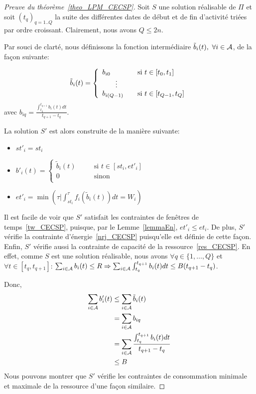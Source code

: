 \begin{proof}[Preuve du théorème~\ref{theo_LPM_CECSP}]  
  Soit $S$ une solution réalisable de $\Pi$ et soit
  $(t_q)_{q=1..Q}$ la suite des différentes dates de
  début et de fin d'activité triées par ordre croissant. Clairement,
  nous avons $Q\le 2n$. 

  Par souci de clarté, nous définissons la fonction intermédiaire
  $\tilde{b}_i(t),\ \forall i \in {\cal A}$, de la façon suivante:  

    \[\tilde{b}_i(t) =\left\{
        \begin{array}{lll}
          b_{i0} & & \text{si $t \in [t_0,t_1]$}\\
          \multicolumn{2}{c}{\vdots} &   \\
          b_{i(Q-1)} & & \text{si $t \in [t_{Q-1},t_Q]$}
        \end{array}
      \right.\]
    avec $b_{iq}=\frac{\int_{t_q}^{t_{q+1}} b_i(t) dt}{t_{q+1}-t_q}$.

    La solution $S'$ est alors construite de la manière suivante: 
    \begin{itemize}
    \item $st'_i=st_i$ 
    \item $b'_i(t)= \left\{ 
        \begin{array}{lll}
          \tilde{b}_i(t) &\quad& \text{si $t \in [st_i,et'_i]$}\\
          0 &\quad& \text{sinon}\\
        \end{array}
      \right.$
  \item $et'_i=\min(\tau | \int_{st_i}^{\tau} f_i(\tilde{b}_i(t))dt=W_i)$
  \end{itemize}

  Il est facile de voir que $S'$ satisfait les contraintes de fenêtres de
  temps~\eqref{tw_CECSP}, puisque, par le Lemme~\ref{lemmaEn},
  $et'_i\le et_i$. De plus, $S'$ vérifie la contrainte 
  d'énergie~\eqref{nrj_CECSP} puisqu'elle est définie de cette
  façon. Enfin, $S'$ vérifie aussi la contrainte de capacité de la
  ressource~\eqref{res_CECSP}. En effet, comme $S$ est une solution
  réalisable, nous avons $\forall q \in \{1,\dots,Q\}$ et $\forall t
  \in [t_q,t_{q+1}]$:  
  $\sum_{i\in {\cal A}}b_i(t) \le R \Rightarrow  
  \sum_{i\in {\cal A}} \int_{t_q}^{t_{q+1}} b_i(t)dt \le B(t_{q+1}-t_q)$.
 
  Donc, 
  \begin{align*}
    \sum_{i\in {\cal A}}b'_i(t) &\le 
                            \sum_{i\in {\cal A}} \tilde{b}_i(t)\\
                          &= 
                            \sum_{i\in {\cal A}} b_{iq}\\
                          &=
                            \sum_{i\in {\cal A}} \frac{\int_{t_q}^{t_{q+1}} b_i(t)dt}{t_{q+1}-t_q} \\
                          &\le B
  \end{align*}
  Nous pouvons montrer que $S'$ vérifie les contraintes de
  consommation minimale et maximale de la ressource d'une façon
  similaire. 
\end{proof}

